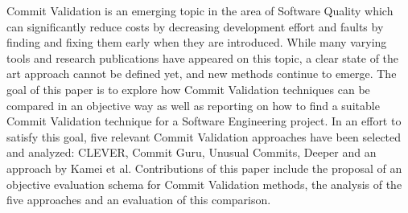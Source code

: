 
Commit Validation is an emerging topic in the area of Software Quality which can significantly reduce costs by decreasing development effort and faults by finding and fixing them early when they are introduced. While many varying tools and research publications have appeared on this topic, a clear state of the art approach 
cannot be defined yet, and new methods continue to emerge.
The goal of this paper is to explore how Commit Validation techniques can be compared in an objective way as well as reporting on how to find a suitable Commit Validation technique for a Software Engineering project.
In an effort to satisfy this goal, five relevant Commit Validation approaches have been selected and analyzed: CLEVER, Commit Guru, Unusual Commits, Deeper and an approach by Kamei et al.
Contributions of this paper include the proposal of an objective evaluation schema for Commit Validation methods, the analysis of the five approaches and an evaluation of this comparison.